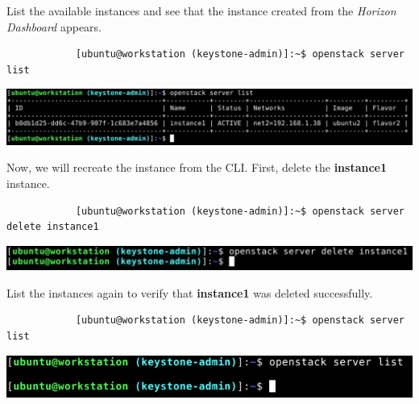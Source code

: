 \documentclass[letterpaper, 12pt]{article}
\begin{document}
\begin{enumerate}
    \begin{labstep}
        List the available instances and see that the instance created from the \textit{Horizon Dashboard} appears.
        \begin{lstlisting}
            [ubuntu@workstation (keystone-admin)]:~$ openstack server list
        \end{lstlisting}

        \begin{center}
            \includegraphics[width=\linewidth]{images/part4/step9.png}
        \end{center}
    \end{labstep}

    \begin{labstep}
        Now, we will recreate the instance from the CLI.
        First, delete the \textbf{instance1} instance.
        \begin{lstlisting}
            [ubuntu@workstation (keystone-admin)]:~$ openstack server delete instance1
        \end{lstlisting}

        \begin{center}
            \includegraphics[width=\linewidth]{images/part4/step10.png}
        \end{center}
    \end{labstep}

    \begin{labstep}
        List the instances again to verify that \textbf{instance1} was deleted successfully.
        \begin{lstlisting}
            [ubuntu@workstation (keystone-admin)]:~$ openstack server list
        \end{lstlisting}

        \begin{center}
            \includegraphics[width=\linewidth]{images/part4/step11.png}
        \end{center}
    \end{labstep}


\end{enumerate}
\end{document}
